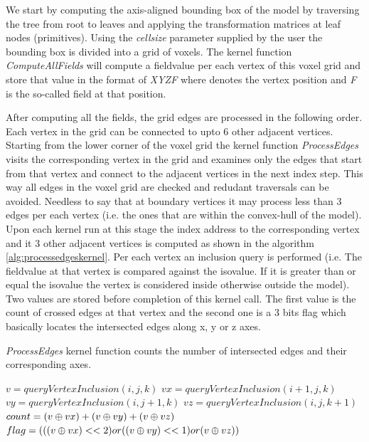 We start by computing the axis-aligned bounding box of the model by traversing the tree from root to leaves 
and applying the transformation matrices at leaf nodes (primitives). Using the \textit{cellsize} parameter supplied by the user the 
bounding box is divided into a grid of voxels. The kernel function \textit{ComputeAllFields} will compute a fieldvalue per each
vertex of this voxel grid and store that value in the format of \textit{XYZF} where  denotes the vertex position and 
\textit{F} is the so-called field at that position. 


After computing all the fields, the grid edges are processed in the following order. 
Each vertex in the grid can be connected to upto 6 other adjacent vertices. Starting from the lower corner of the voxel grid 
the kernel function \textit{ProcessEdges} visits the corresponding vertex in the grid and examines only the edges that start 
from that vertex and connect to the adjacent vertices in the next index step. This way all edges in the voxel grid are checked 
and redudant traversals can be avoided. Needless to say that at boundary vertices it may process less than 3 edges per each 
vertex (i.e. the ones that are within the convex-hull of the model). Upon each kernel run at this stage the index address to 
the corresponding vertex and it 3 other adjacent vertices is computed as shown in the algorithm \ref{alg:processedgeskernel}. Per each vertex
an inclusion query is performed (i.e. The fieldvalue at that vertex is compared against the isovalue. If it is greater than or equal 
the isovalue the vertex is considered inside otherwise outside the model). Two values are stored before completion of this kernel call. 
The first value is the count of crossed edges at that vertex and the second one is a 3 bits flag which basically locates the intersected 
edges along x, y or z axes.


\begin{algorithm}[H]
\caption{\textit{ProcessEdges} kernel function counts the number of intersected edges and their corresponding axes.}
\label{alg:processedgeskernel}
\begin{algorithmic}[1]	
  \STATE $v = queryVertexInclusion(i, j, k)$
  \STATE $vx = queryVertexInclusion(i+1, j, k)$
  \STATE $vy = queryVertexInclusion(i, j+1, k)$
  \STATE $vz = queryVertexInclusion(i, j, k+1)$
  \STATE $count = (v \mathbin{\oplus} vx) + (v \mathbin{\oplus} vy) + (v \mathbin{\oplus} vz)$
  \STATE $flag = (((v \mathbin{\oplus} vx) << 2) or ((v \mathbin{\oplus} vy) << 1) or (v \mathbin{\oplus} vz))$
\end{algorithmic}
\end{algorithm}



































